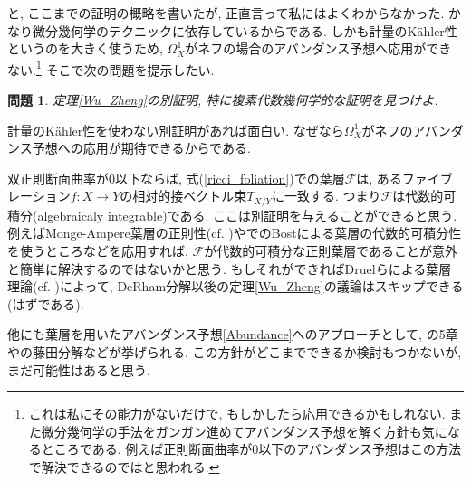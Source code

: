 \documentclass[12pt]{amsart}
\newtheorem{ques}[thm]{問題}
\theoremstyle{definition}
\theoremstyle{remark}
\begin{document}
と, ここまで\cite{WZ02}の証明の概略を書いたが, 正直言って私にはよくわからなかった.
かなり微分幾何学のテクニックに依存しているからである. しかも計量のK\"ahler性というのを大きく使うため, $\Omega_{X}^{1}$がネフの場合のアバンダンス予想へ応用ができない.\footnote{これは私にその能力がないだけで, もしかしたら応用できるかもしれない. また微分幾何学の手法をガンガン進めてアバンダンス予想を解く方針も気になるところである. 例えば正則断面曲率が0以下のアバンダンス予想はこの方法で解決できるのではと思われる.}
そこで次の問題を提示したい.

\begin{ques}
\label{another_proof}
定理\ref{Wu_Zheng}の別証明, 特に複素代数幾何学的な証明を見つけよ.
\end{ques}
計量のK\"ahler性を使わない別証明があれば面白い. なぜなら$\Omega_{X}^{1}$がネフのアバンダンス予想への応用が期待できるからである.

双正則断面曲率が$0$以下ならば, 式(\ref{ricci_foliation})での葉層$\mathcal{F}$は, あるファイブレーション$f : X \rightarrow Y$の相対的接ベクトル束$T_{X/Y}$に一致する. つまり$\mathcal{F}$は代数的可積分(algebraicaly integrable)である. 
ここは別証明を与えることができると思う. 
例えばMonge-Ampere葉層の正則性(cf. \cite{Koike21})や\cite{Druel17}でのBostによる葉層の代数的可積分性を使うところなどを応用すれば, $\mathcal{F}$が代数的可積分な正則葉層であることが意外と簡単に解決するのではないかと思う. 
もしそれができればDruelらによる葉層理論(cf. \cite{Druel17})によって, DeRham分解以後の定理\ref{Wu_Zheng}の議論はスキップできる(はずである).

他にも葉層を用いたアバンダンス予想\ref{Abundance}へのアプローチとして, \cite{Gon16}の5章や\cite{IM22}の藤田分解などが挙げられる.
この方針がどこまでできるか検討もつかないが, まだ可能性はあると思う. 
\end{document}
